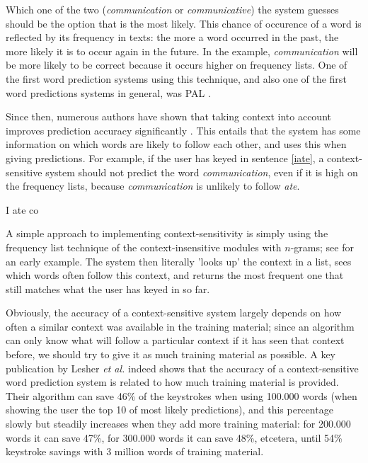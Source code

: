 \documentclass[11pt]{article}
\begin{document}
Which one of the two (\emph{communication} or \emph{communicative}) the system guesses should be the option that is the most likely. This chance of occurence of a word is reflected by its frequency in texts: the more a word occurred in the past, the more likely it is to occur again in the future. In the example, \emph{communication} will be more likely to be correct because it occurs higher on frequency lists. One of the first word prediction systems using this technique, and also one of the first word predictions systems in general, was PAL \cite{swiffin+85}. 

Since then, numerous authors have shown that taking context into account improves prediction accuracy significantly \cite{Lesher+99,Garay-Vitoria+06,Tanaka-Ishii07,vandenbosch+08}. This entails that the system has some information on which words are likely to follow each other, and uses this when giving predictions. For example, if the user has keyed in sentence \ref{iate}, a context-sensitive system should not predict the word \emph{communication}, even if it is high on the frequency lists, because \emph{communication} is unlikely to follow \emph{ate}.

\begin{examples}
\item I ate co \label{iate}
\end{examples}

A simple approach to implementing context-sensitivity is simply using the frequency list technique of the context-insensitive modules with $n$-grams;  see \cite{hunnicutt87} for an early example. The system then literally 'looks up' the context in a list, sees which words often follow this context, and returns the most frequent one that still matches what the user has keyed in so far.

Obviously, the accuracy of a context-sensitive system largely depends on how often a similar context was available in the training material; since an algorithm can only know what will follow a particular context if it has seen that context before, we should try to give it as much training material as possible. A key publication by Lesher {\em et al.}  indeed shows that the accuracy of a context-sensitive word prediction system is related to how much training material is provided. Their algorithm can save 46\% of the keystrokes when using 100.000 words (when showing the user the top 10 of most likely predictions), and this percentage slowly but steadily increases when they add more training material: for 200.000 words it can save 47\%, for 300.000 words it can save 48\%, etcetera, until 54\% keystroke savings with 3 million words of training material.
\end{document}
